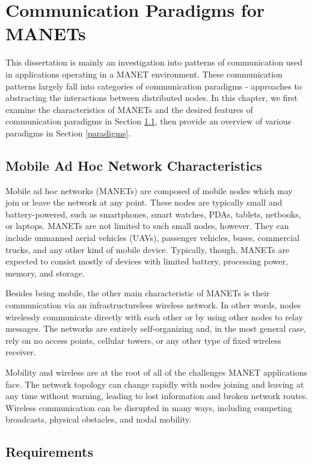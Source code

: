 \chapter{Communication Paradigms for MANETs}\label{chapter:paradigms}

This dissertation is mainly an investigation into patterns of communication used in applications operating in a MANET environment. These communication patterns largely fall into categories of communication paradigms - approaches to abstracting the interactions between distributed nodes. In this chapter, we first examine the characteristics of MANETs and the desired features of communication paradigms in Section \ref{characters}, then provide an overview of various paradigms in Section \ref{paradigms}.

\section{Mobile Ad Hoc Network Characteristics}\label{characters}

Mobile ad hoc networks (MANETs) are composed of mobile nodes which may join or leave the network at any point. These nodes are typically small and battery-powered, such as smartphones, smart watches, PDAs, tablets, netbooks, or laptops. MANETs are not limited to such small nodes, however. They can include unmanned aerial vehicles (UAVs), passenger vehicles, buses, commercial trucks, and any other kind of mobile device. Typically, though, MANETs are expected to consist mostly of devices with limited battery, processing power, memory, and storage.

Besides being mobile, the other main characteristic of MANETs is their communication via an infrastructureless wireless network. In other words, nodes wirelessly communicate directly with each other or by using other nodes to relay messages. The networks are entirely self-organizing and, in the most general case, rely on no access points, cellular towers, or any other type of fixed wireless receiver.

Mobility and wireless are at the root of all of the challenges MANET applications face. The network topology can change rapidly with nodes joining and leaving at any time without warning, leading to lost information and broken network routes. Wireless communication can be disrupted in many ways, including competing broadcasts, physical obstacles, and nodal mobility.

\section{Requirements}\label{sec:manetrecs}

